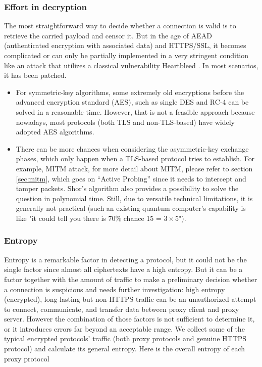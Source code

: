 \documentclass[conference]{IEEEtran}
\begin{document}
\subsubsection{Effort in decryption}
 The most straightforward way to decide whether a connection is valid is to retrieve the carried payload and censor it. But in the age of AEAD (authenticated encryption with associated data) and HTTPS/SSL, it becomes complicated or can only be partially implemented in a very stringent condition like an attack that utilizes a classical vulnerability Heartbleed \cite{Heartbleed}. In most scenarios, it has been patched.
 \begin{itemize}
    \item  For symmetric-key algorithms, some extremely old encryptions before the advanced encryption standard (AES), such as single DES and RC-4 can be solved in a reasonable time. However, that is not a feasible approach because nowadays, most protocols (both TLS and non-TLS-based) have widely adopted AES algorithms.
    \item There can be more chances when considering the asymmetric-key exchange phases, which only happen when a TLS-based protocol tries to establish. For example, MITM attack, for more detail about MITM, please refer to section \ref{sec:mitm}, which goes on “Active Probing” since it needs to intercept and tamper packets. Shor’s algorithm \cite{Shors_Algorithm} also provides a possibility to solve the question in polynomial time. Still, due to versatile technical limitations, it is generally not practical (such an existing quantum computer’s capability is like "it could tell you there is 70\% chance 15 = $3\times$5").
 \end{itemize}


\subsubsection{Entropy}
Entropy is a remarkable factor in detecting a protocol, but it could not be the single factor since almost all ciphertexts have a high entropy. But it can be a factor together with the amount of traffic to make a preliminary decision whether a connection is suspicious and needs further investigation: high entropy (encrypted), long-lasting but non-HTTPS traffic can be an unauthorized attempt to connect, communicate, and transfer data between proxy client and proxy server. However the combination of those factors is not sufficient to determine it, or it introduces errors far beyond an acceptable range.
We collect some of the typical encrypted protocols' traffic (both proxy protocols and genuine HTTPS protocol) and calculate its general entropy.
Here is the overall entropy of each proxy protocol
\end{document}
